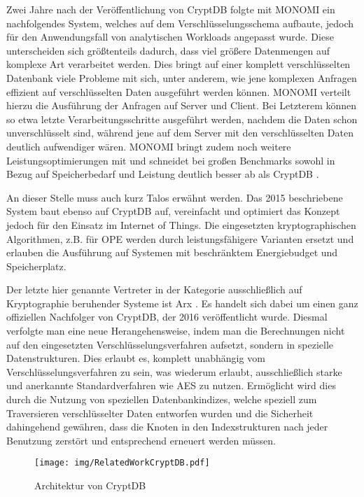 Zwei Jahre nach der Veröffentlichung von CryptDB folgte mit MONOMI \cite{Tu2013} ein nachfolgendes System, welches auf dem Verschlüsselungsschema aufbaute, jedoch für den Anwendungsfall von analytischen Workloads angepasst wurde. Diese unterscheiden sich größtenteils dadurch, dass viel größere Datenmengen auf komplexe Art verarbeitet werden. Dies bringt auf einer komplett verschlüsselten Datenbank viele Probleme mit sich, unter anderem, wie jene komplexen Anfragen effizient auf verschlüsselten Daten ausgeführt werden können. MONOMI verteilt hierzu die Ausführung der Anfragen auf Server und Client. Bei Letzterem können so etwa letzte Verarbeitungsschritte ausgeführt werden, nachdem die Daten schon unverschlüsselt sind, während jene auf dem Server mit den verschlüsselten Daten deutlich aufwendiger wären. MONOMI bringt zudem noch weitere Leistungsoptimierungen mit und schneidet bei großen Benchmarks sowohl in Bezug auf Speicherbedarf und Leistung deutlich besser ab als CryptDB \cite{Tu2013}.

An dieser Stelle muss auch kurz Talos \cite{Shafagh2015} erwähnt werden. Das 2015 beschriebene System baut ebenso auf CryptDB auf, vereinfacht und optimiert das Konzept jedoch für den Einsatz im Internet of Things. Die eingesetzten kryptographischen Algorithmen, z.B. für OPE werden durch leistungsfähigere Varianten ersetzt und erlauben die Ausführung auf Systemen mit beschränktem Energiebudget und Speicherplatz.

Der letzte hier genannte Vertreter in der Kategorie ausschließlich auf Kryptographie beruhender Systeme ist Arx \cite{Poddar2016}. Es handelt sich dabei um einen ganz offiziellen Nachfolger von CryptDB, der 2016 veröffentlicht wurde. Diesmal verfolgte man eine neue Herangehensweise, indem man die Berechnungen nicht auf den eingesetzten Verschlüsselungsverfahren aufsetzt, sondern in spezielle Datenstrukturen. Dies erlaubt es, komplett unabhängig vom Verschlüsselungsverfahren zu sein, was wiederum erlaubt, ausschließlich starke und anerkannte Standardverfahren wie AES zu nutzen. Ermöglicht wird dies durch die Nutzung von speziellen Datenbankindizes, welche speziell zum Traversieren verschlüsselter Daten entworfen wurden und die Sicherheit dahingehend gewähren, dass die Knoten in den Indexstrukturen nach jeder Benutzung zerstört und entsprechend erneuert werden müssen.

\begin{figure}
	\texttt{[image: img/RelatedWorkCryptDB.pdf]}
	\centering
	\caption{Architektur von CryptDB}
	\label{fig:cryptdb}
\end{figure}

